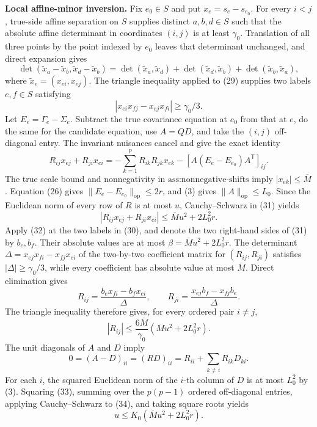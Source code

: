 \textbf{Local affine-minor inversion.}
Fix \(e_0\in S\) and put \(x_e=s_e-s_{e_0}\). For every \(i<j\), true-side affine separation on \(S\) supplies distinct \(a,b,d\in S\) such that the absolute affine determinant in coordinates \((i,j)\) is at least \(\gamma_0\). Translation of all three points by the point indexed by \(e_0\) leaves that determinant unchanged, and direct expansion gives
\[
\det(\widetilde x_a-\widetilde x_b,
\widetilde x_d-\widetilde x_b)
=\det(\widetilde x_a,\widetilde x_d)
+\det(\widetilde x_d,\widetilde x_b)
+\det(\widetilde x_b,\widetilde x_a),
\tag{29}
\]
where \(\widetilde x_e=(x_{ei},x_{ej})\). The triangle inequality applied to (29) supplies two labels \(e,f\in S\) satisfying
\[
|x_{ei}x_{fj}-x_{ej}x_{fi}|\geq\gamma_0/3.
\tag{30}
\]
Let \(E_e=\Gamma_e-\Sigma_e\). Subtract the true covariance equation at \(e_0\) from that at \(e\), do the same for the candidate equation, use \(A=QD\), and take the \((i,j)\) off-diagonal entry. The invariant nuisances cancel and give the exact identity
\[
R_{ij}x_{ej}+R_{ji}x_{ei}
=-\sum_{k=1}^pR_{ik}R_{jk}x_{ek}
-[A(E_e-E_{e_0})A^{\mathsf T}]_{ij}.
\tag{31}
\]
The true scale bound and nonnegativity in \(\text{ass:nonnegative-shifts}\) imply \(|x_{ek}|\leq\overline M\). Equation (26) gives \(\|E_e-E_{e_0}\|_{\mathrm{op}}\leq2r\), and (3) gives \(\|A\|_{\mathrm{op}}\leq L_0\). Since the Euclidean norm of every row of \(R\) is at most \(u\), Cauchy--Schwarz in (31) yields
\[
|R_{ij}x_{ej}+R_{ji}x_{ei}|
\leq\overline M u^2+2L_0^2r.
\tag{32}
\]
Apply (32) at the two labels in (30), and denote the two right-hand sides of (31) by \(b_e,b_f\). Their absolute values are at most \(\beta=\overline M u^2+2L_0^2r\). The determinant \(\Delta=x_{ej}x_{fi}-x_{fj}x_{ei}\) of the two-by-two coefficient matrix for \((R_{ij},R_{ji})\) satisfies \(|\Delta|\geq\gamma_0/3\), while every coefficient has absolute value at most \(\overline M\). Direct elimination gives
\[
R_{ij}=\frac{b_ex_{fi}-b_fx_{ei}}{\Delta},
\qquad
R_{ji}=\frac{x_{ej}b_f-x_{fj}b_e}{\Delta}.
\]
The triangle inequality therefore gives, for every ordered pair \(i\neq j\),
\[
|R_{ij}|
\leq\frac{6\overline M}{\gamma_0}
\left(\overline M u^2+2L_0^2r\right).
\tag{33}
\]
The unit diagonals of \(A\) and \(D\) imply
\[
0=(A-D)_{ii}=(RD)_{ii}
=R_{ii}+\sum_{k\neq i}R_{ik}D_{ki}.
\tag{34}
\]
For each \(i\), the squared Euclidean norm of the \(i\)-th column of \(D\) is at most \(L_0^2\) by (3). Squaring (33), summing over the \(p(p-1)\) ordered off-diagonal entries, applying Cauchy--Schwarz to (34), and taking square roots yields
\[
u\leq K_0\left(\overline M u^2+2L_0^2r\right).
\tag{35}
\]

